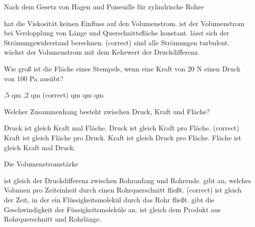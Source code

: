 \documentclass[11pt]{exam}
\begin{document}
\setlength{\voffset}{-0.5in}
\setlength{\headsep}{5pt}

\hspace{2mm}
 \hspace{5mm}
\vspace{4mm}

\begin{questions}

\question Nach dem Gesetz von Hagen und Poiseuille für zylindrische Rohre

\begin{choices}
	\choice hat die Viskosität keinen Einfluss auf den Volumenstrom.
	\choice ist der Volumenstrom bei Verdopplung von Länge und Querschnittsfläche konstant.
	\choice lässt sich der Strömungswiderstand berechnen. (correct)
	\choice sind alle Strömungen turbulent.
	\choice wächst der Volumenstrom mit dem Kehrwert der Druckdifferenz.
\end{choices}

\vspace{3mm}\question Wie groß ist die Fläche eines Stempels, wenn eine Kraft von 20 N einen Druck von 100 Pa ausübt?

\begin{choices}
	,5 qm
	,2 qm (correct)
	 qm
	 qm
	 qm
\end{choices}

\vspace{3mm}\question Welcher Zusammenhang besteht zwischen Druck, Kraft und Fläche?

\begin{choices}
	\choice Druck ist gleich Kraft mal Fläche.
	\choice Druck ist gleich Kraft pro Fläche. (correct)
	\choice Kraft ist gleich Fläche pro Druck.
	\choice Kraft ist gleich Druck pro Fläche.
	\choice Fläche ist gleich Kraft mal Druck.
\end{choices}

\vspace{3mm}\question Die Volumenstromstärke

\begin{choices}
	\choice ist gleich der Druckdifferenz zwischen Rohranfang und Rohrende.
	\choice gibt an, welches Volumen pro Zeiteinheit durch einen Rohrquerschnitt fließt. (correct)
	\choice ist gleich der Zeit, in der ein Flüssigkeitsmolekül durch das Rohr fließt.
	\choice gibt die Geschwindigkeit der Füssigkeitsmoleküle an.
	\choice ist gleich dem Produkt aus Rohrquerschnitt und Rohrlänge.
\end{choices}


\end{questions}
\end{document}
